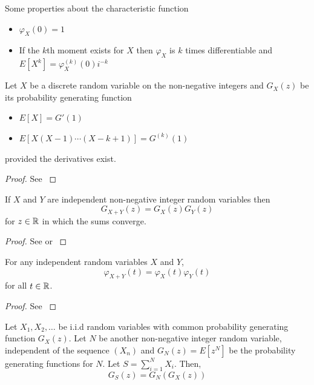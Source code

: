 \begin{remark}
Some properties about the characteristic function
\begin{itemize}
    \item $\varphi_X(0) = 1$
    \item If the $k$th moment exists for $X$ then $\varphi_X$ is $k$ times differentiable and $E[X^k] = \varphi_{X}^{(k)}(0) i^{-k}$
\end{itemize}
\end{remark}

\begin{theorem}
Let $X$ be a discrete random variable on the non-negative integers and $G_X(z)$ be its probability generating function
\begin{itemize}
    \item $E[X] = G'(1)$
    \item $E[X (X - 1) \cdots (X - k + 1)] = G^{(k)}(1)$
\end{itemize}
provided the derivatives exist.
\end{theorem}

\begin{proof}
See \cite{grimmett2001}
\end{proof}

\begin{theorem}
If $X$ and $Y$ are independent non-negative integer random variables then
$$
G_{X + Y}(z) = G_X(z) G_Y(z)
$$
for $z \in \mathbb{R}$ in which the sums converge.
\end{theorem}

\begin{proof}
See \cite{grimmett2001} or \cite{Ross_SP_95}
\end{proof}

\begin{theorem}
For any independent random variables $X$ and $Y$,
$$
\varphi_{X + Y}(t) = \varphi_X(t) \varphi_Y(t)
$$
for all $t \in \mathbb{R}$.
\end{theorem}

\begin{proof}
See \cite{grimmett2001}
\end{proof}

\begin{theorem}\label{thm:generating_random_sum}
Let $X_1, X_2, \ldots$ be i.i.d random variables with common probability generating function $G_X(z)$.
Let $N$ be another non-negative integer random variable, independent of the sequence $(X_n)$ and $G_N(z) = E[z^N]$ be the probability generating functions for $N$.
Let $S = \sum_{i = 1}^N X_i$.
Then,
$$
G_S(z) = G_N(G_X(z))
$$
\end{theorem}

